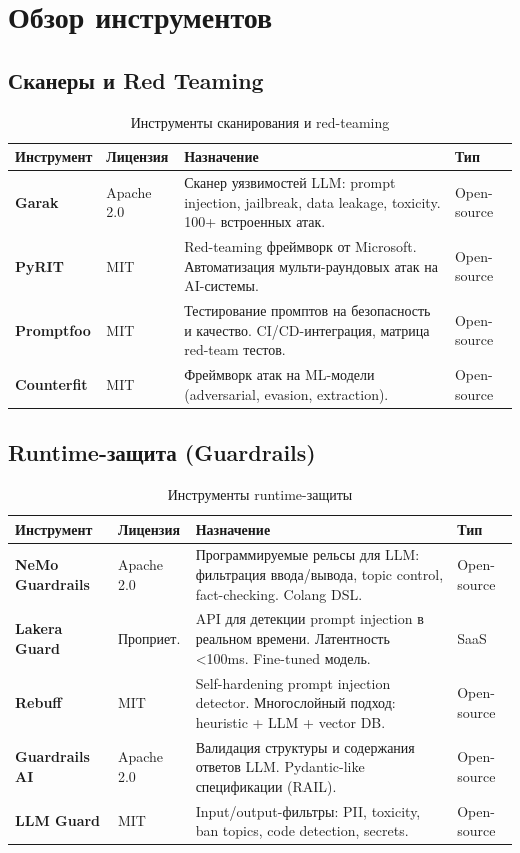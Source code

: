\documentclass[12pt,a4paper]{article}
\begin{document}
\section{Обзор инструментов}

\subsection{Сканеры и Red Teaming}

\begin{table}[H]
\centering
\small
\renewcommand{\arraystretch}{1.3}
\begin{tabularx}{\textwidth}{>{\bfseries\sffamily}l l X l}
\toprule
Инструмент & Лицензия & Назначение & Тип \\
\midrule
Garak & Apache 2.0 & Сканер уязвимостей LLM: prompt injection, jailbreak, data leakage, toxicity. 100+ встроенных атак. & Open-source \\
\addlinespace
PyRIT & MIT & Red-teaming фреймворк от Microsoft. Автоматизация мульти-раундовых атак на AI-системы. & Open-source \\
\addlinespace
Promptfoo & MIT & Тестирование промптов на безопасность и качество. CI/CD-интеграция, матрица red-team тестов. & Open-source \\
\addlinespace
Counterfit & MIT & Фреймворк атак на ML-модели (adversarial, evasion, extraction). & Open-source \\
\bottomrule
\end{tabularx}
\caption{Инструменты сканирования и red-teaming}
\end{table}

\subsection{Runtime-защита (Guardrails)}

\begin{table}[H]
\centering
\small
\renewcommand{\arraystretch}{1.3}
\begin{tabularx}{\textwidth}{>{\bfseries\sffamily}l l X l}
\toprule
Инструмент & Лицензия & Назначение & Тип \\
\midrule
NeMo Guardrails & Apache 2.0 & Программируемые рельсы для LLM: фильтрация ввода/вывода, topic control, fact-checking. Colang DSL. & Open-source \\
\addlinespace
Lakera Guard & Проприет. & API для детекции prompt injection в реальном времени. Латентность <100ms. Fine-tuned модель. & SaaS \\
\addlinespace
Rebuff & MIT & Self-hardening prompt injection detector. Многослойный подход: heuristic + LLM + vector DB. & Open-source \\
\addlinespace
Guardrails AI & Apache 2.0 & Валидация структуры и содержания ответов LLM. Pydantic-like спецификации (RAIL). & Open-source \\
\addlinespace
LLM Guard & MIT & Input/output-фильтры: PII, toxicity, ban topics, code detection, secrets. & Open-source \\
\bottomrule
\end{tabularx}
\caption{Инструменты runtime-защиты}
\end{table}
\end{document}
